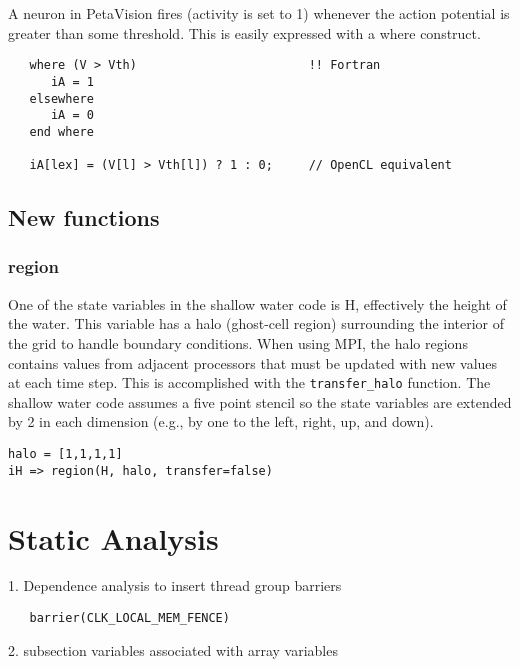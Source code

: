 \documentclass[10pt, conference, compsocconf]{IEEEtran}
\begin{document}
A neuron in PetaVision fires (activity is set to 1)
whenever the action potential is greater than some threshold.
This is easily expressed with a where construct.

\begin{verbatim}
   where (V > Vth)                        !! Fortran
      iA = 1
   elsewhere
      iA = 0
   end where

   iA[lex] = (V[l] > Vth[l]) ? 1 : 0;     // OpenCL equivalent
\end{verbatim}

\subsection{New functions}

\subsubsection{region}

One of the state variables in the shallow water code is H, effectively the
height of the water.  This variable has a halo (ghost-cell region) surrounding
the interior of the grid to handle boundary conditions.  When using
MPI, the halo regions contains values from adjacent processors that must be
updated with new values at each time step.  This is accomplished with the
{\tt transfer\_halo} function.  The shallow water code assumes a five point stencil
so the state variables are extended by 2 in each dimension (e.g., by one to the
left, right, up, and down).

\begin{verbatim}
halo = [1,1,1,1]
iH => region(H, halo, transfer=false)
\end{verbatim}

\section{Static Analysis}

1. Dependence analysis to insert thread group barriers

\begin{verbatim}
   barrier(CLK_LOCAL_MEM_FENCE)
\end{verbatim}

2. subsection variables associated with array variables
\end{document}
